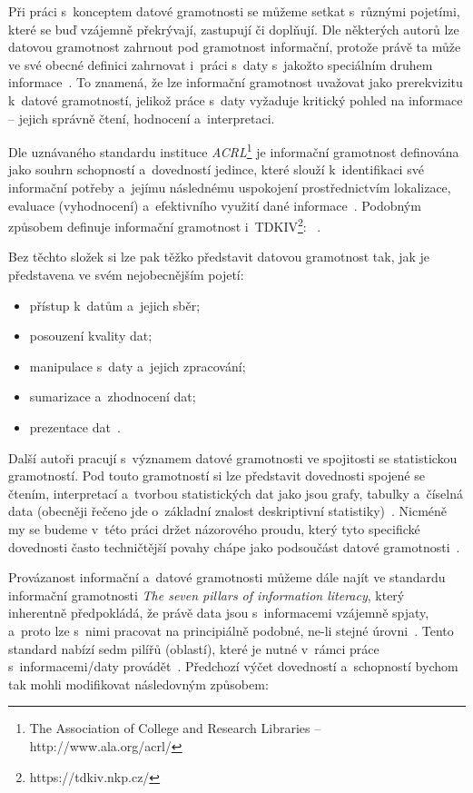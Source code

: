Při práci s~konceptem datové gramotnosti se můžeme setkat s~různými pojetími, které se buď vzájemně překrývají, zastupují či doplňují. Dle některých autorů lze datovou gramotnost zahrnout pod gramotnost informační, protože právě ta může ve své obecné definici zahrnovat i~práci s~daty s~jakožto speciálním druhem informace~\parencite[126]{calzada13}. To znamená, že lze informační gramotnost uvažovat jako prerekvizitu k~datové gramotností, jelikož práce s~daty vyžaduje kritický pohled na informace -- jejich správně čtení, hodnocení a~interpretaci.

Dle uznávaného standardu instituce \emph{ACRL}\footnote{The Association of College and Research Libraries – http://www.ala.org/acrl/} je informační gramotnost definována jako souhrn schopností a~dovedností jedince, které slouží k~identifikaci své informační potřeby a~jejímu následnému uspokojení prostřednictvím lokalizace, evaluace (vyhodnocení) a~efektivního využití dané informace~\parencite[2]{acrl14}. Podobným způsobem definuje informační gramotnost i~TDKIV\footnote{https://tdkiv.nkp.cz/}: ~\parencite{tdkiv03}.

Bez těchto složek si lze pak těžko představit datovou gramotnost tak, jak je představena ve svém nejobecnějším pojetí:

\begin{itemize}
\tightlist
\item
  přístup k~datům a~jejich sběr;
\item
  posouzení kvality dat;
\item
  manipulace s~daty a~jejich zpracování;
\item
  sumarizace a~zhodnocení dat;
\item
  prezentace dat~\parencite[8]{schield05}.
\end{itemize}

Další autoři pracují s~významem datové gramotnosti ve spojitosti se statistickou gramotností. Pod touto gramotností si lze představit dovednosti spojené se čtením, interpretací a~tvorbou statistických dat jako jsou grafy, tabulky a~číselná data (obecněji řečeno jde o~základní znalost deskriptivní statistiky)~\parencite[8]{schield05}. Nicméně my se budeme v~této práci držet názorového proudu, který tyto specifické dovednosti často techničtější povahy chápe jako podsoučást datové gramotnosti~\parencite[125]{calzada13}.

Provázanost informační a~datové gramotnosti můžeme dále najít ve standardu informační gramotnosti \emph{The seven pillars of information literacy}, který inherentně předpokládá, že právě data jsou s~informacemi vzájemně spjaty, a~proto lze s~nimi pracovat na principiálně podobné, ne-li stejné úrovni~\parencite[126]{calzada13}. Tento standard nabízí sedm pilířů (oblastí), které je nutné v~rámci práce s~informacemi/daty provádět~\parencite{sconul11}. Předchozí výčet dovedností a~schopností bychom tak mohli modifikovat následovným způsobem:

